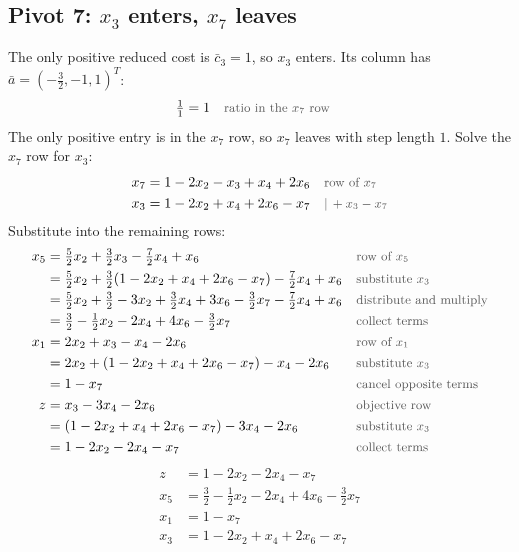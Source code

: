 \documentclass[a4paper,11pt]{article}
\newcommand{\teil}[1]{\subsection*{#1}}
\newcommand{\why}[1]{\text{\small\color{black!65}#1}}
\begin{document}
\teil{Pivot 7: $x_3$ enters, $x_7$ leaves}
The only positive reduced cost is $\bar c_3=1$, so $x_3$ enters. Its column has $\bar a = (-\tfrac32,-1,1)^T$:
\begin{align*}
\tfrac{1}{1} &= 1 && \why{ratio in the $x_7$ row}
\end{align*}
The only positive entry is in the $x_7$ row, so $x_7$ leaves with step length $1$. Solve the $x_7$ row for $x_3$:
\begin{align*}
x_7 &= 1 - 2x_2 - x_3 + x_4 + 2x_6 && \why{row of $x_7$}\\
x_3 &= 1 - 2x_2 + x_4 + 2x_6 - x_7 && \why{$|\,+x_3 - x_7$}
\end{align*}
Substitute into the remaining rows:
\begin{align*}
x_5 &= \tfrac52 x_2 + \tfrac32 x_3 - \tfrac72 x_4 + x_6 && \why{row of $x_5$}\\
&= \tfrac52 x_2 + \tfrac32(1 - 2x_2 + x_4 + 2x_6 - x_7) - \tfrac72 x_4 + x_6 && \why{substitute $x_3$}\\
&=\tfrac52x_2+\tfrac32-3x_2+\tfrac32x_4+3x_6-\tfrac32x_7-\tfrac72x_4+x_6 && \why{distribute and multiply}\\
&= \tfrac32 - \tfrac12 x_2 - 2x_4 + 4x_6 - \tfrac32 x_7 && \why{collect terms}\\
x_1 &= 2x_2 + x_3 - x_4 - 2x_6 && \why{row of $x_1$}\\
&=2x_2+(1-2x_2+x_4+2x_6-x_7)-x_4-2x_6 && \why{substitute $x_3$}\\
&=1-x_7 && \why{cancel opposite terms}\\
z &= x_3 - 3x_4 - 2x_6 && \why{objective row}\\
&= (1 - 2x_2 + x_4 + 2x_6 - x_7) - 3x_4 - 2x_6 && \why{substitute $x_3$}\\
&= 1 - 2x_2 - 2x_4 - x_7 && \why{collect terms}
\end{align*}
\[
\begin{aligned}
z &= 1 - 2x_2 - 2x_4 - x_7\\
x_5 &= \tfrac32 - \tfrac12 x_2 - 2x_4 + 4x_6 - \tfrac32 x_7\\
x_1 &= 1 - x_7\\
x_3 &= 1 - 2x_2 + x_4 + 2x_6 - x_7
\end{aligned}
\]
\end{document}
